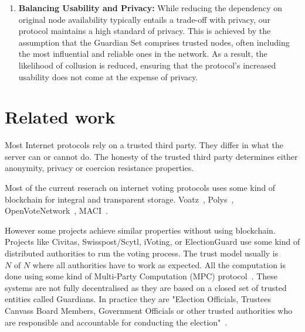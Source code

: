 \documentclass{article}
\begin{document}
\begin{enumerate}
    \item \textbf{Balancing Usability and Privacy:} While reducing the dependency on original node availability typically entails a trade-off with privacy, our protocol maintains a high standard of privacy. This is achieved by the assumption that the Guardian Set comprises trusted nodes, often including the most influential and reliable ones in the network. As a result, the likelihood of collusion is reduced, ensuring that the protocol's increased usability does not come at the expense of privacy.
    
\end{enumerate}

\section{Related work}
Most Internet protocols rely on a trusted third party. They differ in what the server can or cannot do. The honesty of the trusted third party determines either anonymity, privacy or coercion resistance properties.

Most of the current reserach on internet voting protocols uses some kind of blockchain for integral and transparent storage. 
Voatz~\cite{mooreWestVirginiaMobile2019}, 
Polys~\cite{PolysOnlineVoting}, 
OpenVoteNetwork~\cite{haoAnonymousVotingTworound2010}, MACI~\cite{ethereumfoundationMinimalAntiCollusionInfrastructure2022}.

However some projects achieve similar properties without using blockchain. Projects like Civitas, Swisspost/Scytl, iVoting, or ElectionGuard use some kind of distributed authorities to run the voting process. The trust model usually is $N \textrm{ of } N$ where all authorities have to work as expected. All the computation is done using some kind of Multi-Party Computation (MPC) protocol~\cite{boweMultipartyProtocolConstructing2018}.
These systems are not fully decentralised as they are based on a closed set of trusted entities called Guardians. In practice they are "Election Officials, Trustees Canvass Board Members, Government Officials or other trusted authorities who are responsible and accountable for conducting the election"~\cite{ElectionGuardWhoGuardian}.
\end{document}
